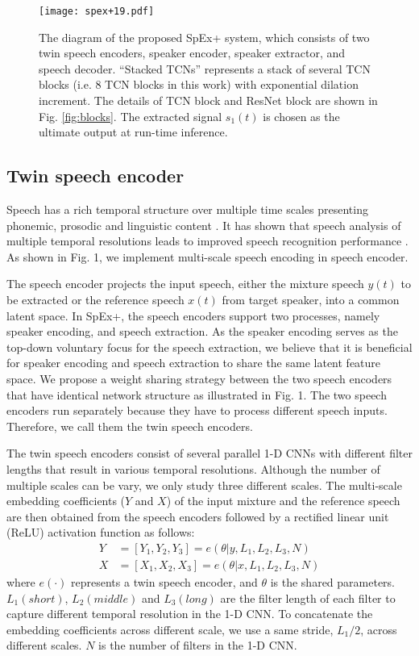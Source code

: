 \documentclass[a4paper]{article}
\begin{document}
\begin{figure}[t]
	\centering
	\texttt{[image: spex+19.pdf]}
	\caption{The diagram of the proposed SpEx+ system, which consists of two twin speech encoders, speaker encoder, speaker extractor, and speech decoder. ``Stacked TCNs'' represents a stack of several TCN blocks (i.e. 8 TCN blocks in this work) with exponential dilation increment. The details of TCN block and ResNet block are shown in Fig. \ref{fig:blocks}. The extracted signal $s_1(t)$ is chosen as the ultimate output at run-time inference.}
	\label{fig:speech_production}
\end{figure}

\subsection{Twin speech encoder}
Speech has a rich temporal structure over multiple time scales presenting phonemic, prosodic and linguistic content \cite{toledano2018multi}. It has shown that speech analysis of multiple temporal resolutions leads to improved speech recognition performance \cite{teng2016testing}. As shown in Fig. 1, we implement multi-scale speech encoding in speech encoder.

The speech encoder projects the input speech, either the mixture speech $y(t)$ to be extracted or the reference speech $x(t)$ from target speaker, into a common latent space. In SpEx+, the speech encoders support two processes, namely speaker encoding, and speech extraction. As the speaker encoding serves as the top-down voluntary focus for the speech extraction, we believe that it is beneficial for speaker encoding and speech extraction to share the same latent feature space. We propose a weight sharing strategy between the two speech encoders that have identical network structure as illustrated in Fig. 1. The two speech encoders run separately because they have to process different speech inputs. Therefore, we call them the twin speech encoders.

The twin speech encoders consist of several parallel 1-D CNNs with different filter lengths that result in various temporal resolutions. Although the number of multiple scales can be vary, we only study three different scales. The multi-scale embedding coefficients ($Y$ and $X$) of the input mixture and the reference speech are then obtained from the speech encoders followed by a rectified linear unit (ReLU) activation function as follows:
\begin{align}
    Y &= [Y_1, Y_2, Y_3] = e(\theta|y,L_1,L_2,L_3,N) \\
    X &= [X_1, X_2, X_3] = e(\theta|x,L_1,L_2,L_3,N)
\end{align}
where $e(\cdot)$ represents a twin speech encoder, and $\theta$ is the shared parameters. $L_1(short)$, $L_2(middle)$ and $L_3(long)$ are the filter length of each filter to capture different temporal resolution in the 1-D CNN. To concatenate the embedding coefficients across different scale,
we use a same stride, $L_1/2$, across different scales. $N$ is the number of filters in the 1-D CNN.
\end{document}
